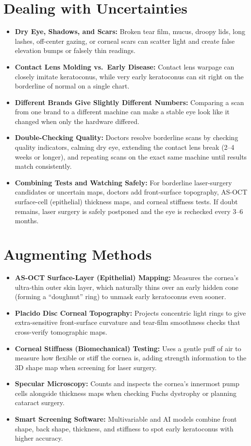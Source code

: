 \section{Dealing with Uncertainties}
\begin{itemize}
    \item \textbf{Dry Eye, Shadows, and Scars:} Broken tear film, mucus, droopy lids, long lashes, off-center gazing, or corneal scars can scatter light and create false elevation bumps or falsely thin readings.
    \item \textbf{Contact Lens Molding vs.\ Early Disease:} Contact lens warpage can closely imitate keratoconus, while very early keratoconus can sit right on the borderline of normal on a single chart.
    \item \textbf{Different Brands Give Slightly Different Numbers:} Comparing a scan from one brand to a different machine can make a stable eye look like it changed when only the hardware differed.
    \item \textbf{Double-Checking Quality:} Doctors resolve borderline scans by checking quality indicators, calming dry eye, extending the contact lens break (2--4 weeks or longer), and repeating scans on the exact same machine until results match consistently.
    \item \textbf{Combining Tests and Watching Safely:} For borderline laser-surgery candidates or uncertain maps, doctors add front-surface topography, AS-OCT surface-cell (epithelial) thickness maps, and corneal stiffness tests. If doubt remains, laser surgery is safely postponed and the eye is rechecked every 3--6 months.
\end{itemize}

\section{Augmenting Methods}
\begin{itemize}
    \item \textbf{AS-OCT Surface-Layer (Epithelial) Mapping:} Measures the cornea's ultra-thin outer skin layer, which naturally thins over an early hidden cone (forming a ``doughnut'' ring) to unmask early keratoconus even sooner.
    \item \textbf{Placido Disc Corneal Topography:} Projects concentric light rings to give extra-sensitive front-surface curvature and tear-film smoothness checks that cross-verify tomographic maps.
    \item \textbf{Corneal Stiffness (Biomechanical) Testing:} Uses a gentle puff of air to measure how flexible or stiff the cornea is, adding strength information to the 3D shape map when screening for laser surgery.
    \item \textbf{Specular Microscopy:} Counts and inspects the cornea's innermost pump cells alongside thickness maps when checking Fuchs dystrophy or planning cataract surgery.
    \item \textbf{Smart Screening Software:} Multivariable and AI models combine front shape, back shape, thickness, and stiffness to spot early keratoconus with higher accuracy.
\end{itemize}

